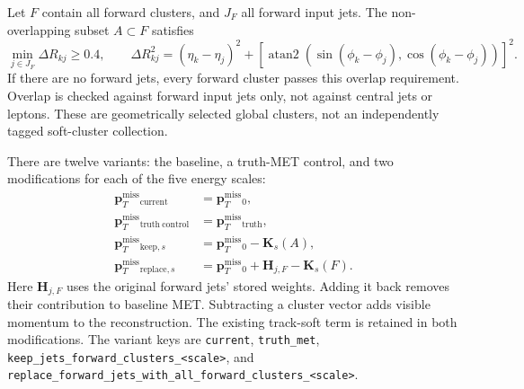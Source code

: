 \documentclass[11pt,a4paper]{article}
\newcommand{\code}[1]{\texttt{\nolinkurl{#1}}}
\newcommand{\ptmiss}{\boldsymbol{p}_{T}^{\mathrm{miss}}}
\begin{document}
Let $F$ contain all forward clusters, and $J_F$ all forward input jets.
The non-overlapping subset $A\subset F$ satisfies
\begin{equation}
 \min_{j\in J_F}\Delta R_{kj}\geq0.4,
 \qquad \Delta R_{kj}^2=(\eta_k-\eta_j)^2+
 \left[\operatorname{atan2}(\sin(\phi_k-\phi_j),
                              \cos(\phi_k-\phi_j))\right]^2.
\end{equation}
If there are no forward jets, every forward cluster passes this overlap
requirement. Overlap is checked against forward input jets only, not against
central jets or leptons. These are geometrically selected global clusters,
not an independently tagged soft-cluster collection.

There are twelve variants: the baseline, a truth-MET control, and two
modifications for each of the five energy scales:
\begin{align}
 \ptmiss_{\mathrm{current}} &= \ptmiss_0,\\
 \ptmiss_{\mathrm{truth\ control}} &= \ptmiss_{\mathrm{truth}},\\
 \ptmiss_{\mathrm{keep},s} &= \ptmiss_0-\boldsymbol{K}_s(A),\\
 \ptmiss_{\mathrm{replace},s} &= \ptmiss_0+
                  \boldsymbol{H}_{j,F}-\boldsymbol{K}_s(F).
\end{align}
Here $\boldsymbol{H}_{j,F}$ uses the original forward jets' stored weights.
Adding it back removes their contribution to baseline MET. Subtracting a
cluster vector adds visible momentum to the reconstruction. The existing
track-soft term is retained in both modifications.
The variant keys are \code{current}, \code{truth_met},
\code{keep_jets_forward_clusters_<scale>}, and
\code{replace_forward_jets_with_all_forward_clusters_<scale>}.
\end{document}
